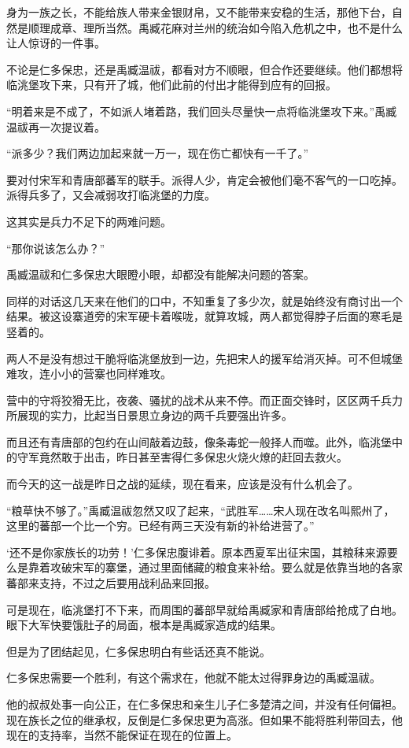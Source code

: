 身为一族之长，不能给族人带来金银财帛，又不能带来安稳的生活，那他下台，自然是顺理成章、理所当然。禹臧花麻对兰州的统治如今陷入危机之中，也不是什么让人惊讶的一件事。

不论是仁多保忠，还是禹臧温祓，都看对方不顺眼，但合作还要继续。他们都想将临洮堡攻下来，只有开了城，他们此前的付出才能得到应有的回报。

“明着来是不成了，不如派人堵着路，我们回头尽量快一点将临洮堡攻下来。”禹臧温祓再一次提议着。

“派多少？我们两边加起来就一万一，现在伤亡都快有一千了。”

要对付宋军和青唐部蕃军的联手。派得人少，肯定会被他们毫不客气的一口吃掉。派得兵多了，又会减弱攻打临洮堡的力度。

这其实是兵力不足下的两难问题。

“那你说该怎么办？”

禹臧温祓和仁多保忠大眼瞪小眼，却都没有能解决问题的答案。

同样的对话这几天来在他们的口中，不知重复了多少次，就是始终没有商讨出一个结果。被这设寨道旁的宋军硬卡着喉咙，就算攻城，两人都觉得脖子后面的寒毛是竖着的。

两人不是没有想过干脆将临洮堡放到一边，先把宋人的援军给消灭掉。可不但城堡难攻，连小小的营寨也同样难攻。

营中的守将狡猾无比，夜袭、骚扰的战术从来不停。而正面交锋时，区区两千兵力所展现的实力，比起当日景思立身边的两千兵要强出许多。

而且还有青唐部的包约在山间敲着边鼓，像条毒蛇一般择人而噬。此外，临洮堡中的守军竟然敢于出击，昨日甚至害得仁多保忠火烧火燎的赶回去救火。

而今天的这一战是昨日之战的延续，现在看来，应该是没有什么机会了。

“粮草快不够了。”禹臧温祓忽然又叹了起来，“武胜军……宋人现在改名叫熙州了，这里的蕃部一个比一个穷。已经有两三天没有新的补给进营了。”

‘还不是你家族长的功劳！’仁多保忠腹诽着。原本西夏军出征宋国，其粮秣来源要么是靠着攻破宋军的寨堡，通过里面储藏的粮食来补给。要么就是依靠当地的各家蕃部来支持，不过之后要用战利品来回报。

可是现在，临洮堡打不下来，而周围的蕃部早就给禹臧家和青唐部给抢成了白地。眼下大军快要饿肚子的局面，根本是禹臧家造成的结果。

但是为了团结起见，仁多保忠明白有些话还真不能说。

仁多保忠需要一个胜利，有这个需求在，他就不能太过得罪身边的禹臧温祓。

他的叔叔处事一向公正，在仁多保忠和亲生儿子仁多楚清之间，并没有任何偏袒。现在族长之位的继承权，反倒是仁多保忠更为高涨。但如果不能将胜利带回去，他现在的支持率，当然不能保证在现在的位置上。

